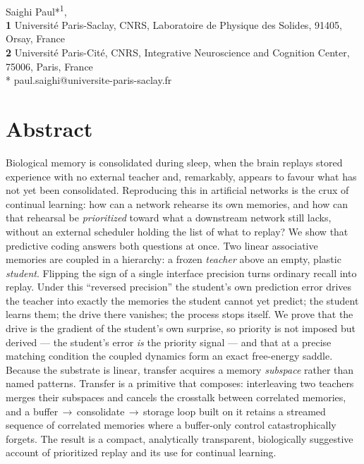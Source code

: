 \documentclass[10pt,letterpaper]{article}
\theoremstyle{plain}
\theoremstyle{remark}
\begin{document}
\vspace*{0.2in}
\begin{flushleft}
{\Large
\textbf{}
}
\newline
\\
Saighi Paul*\textsuperscript{1},
\\
\bigskip
\textbf{1} Universit\'e Paris-Saclay, CNRS, Laboratoire de Physique des Solides, 91405, Orsay, France
\\
\textbf{2} Universit\'e Paris-Cit\'e, CNRS, Integrative Neuroscience and Cognition Center, 75006, Paris, France
\\
\bigskip
* paul.saighi@universite-paris-saclay.fr
\end{flushleft}

\section*{Abstract}
Biological memory is consolidated during sleep, when the brain replays stored experience with no
external teacher and, remarkably, appears to favour what has not yet been consolidated. Reproducing
this in artificial networks is the crux of continual learning: how can a network rehearse its own
memories, and how can that rehearsal be \emph{prioritized} toward what a downstream network still
lacks, without an external scheduler holding the list of what to replay? We show that predictive
coding answers both questions at once. Two linear associative memories are coupled in a hierarchy: a
frozen \emph{teacher} above an empty, plastic \emph{student}. Flipping the sign of a single
interface precision turns ordinary recall into replay. Under this ``reversed precision'' the student's
own prediction error drives the teacher into exactly the memories the student cannot yet predict; the
student learns them; the drive there vanishes; the process stops itself. We prove that the drive is
the gradient of the student's own surprise, so priority is not imposed but derived --- the student's
error \emph{is} the priority signal --- and that at a precise matching condition the coupled dynamics
form an exact free-energy saddle. Because the substrate is linear, transfer acquires a memory
\emph{subspace} rather than named patterns. Transfer is a primitive that composes: interleaving two
teachers merges their subspaces and cancels the crosstalk between correlated memories, and a
buffer\,$\to$\,consolidate\,$\to$\,storage loop built on it retains a streamed sequence of correlated
memories where a buffer-only control catastrophically forgets. The result is a compact, analytically
transparent, biologically suggestive account of prioritized replay and its use for continual learning.
\end{document}
